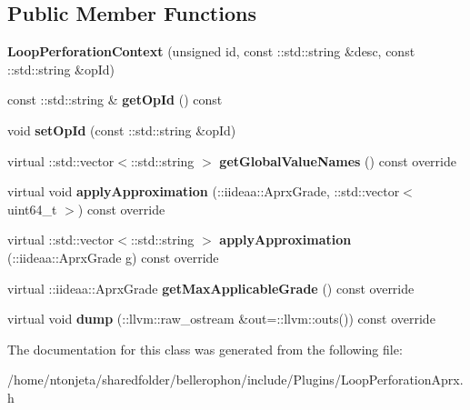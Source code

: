 \subsection*{Public Member Functions}
\begin{DoxyCompactItemize}
\item 
\hypertarget{classLoopPerforationContext_a45eb54006f208abc979cfd6d7c776f8b}{}\label{classLoopPerforationContext_a45eb54006f208abc979cfd6d7c776f8b} 
{\bfseries Loop\+Perforation\+Context} (unsigned id, const \+::std\+::string \&desc, const \+::std\+::string \&op\+Id)
\item 
\hypertarget{classLoopPerforationContext_aeb059a73cd5bacdd4041aad1732d72d6}{}\label{classLoopPerforationContext_aeb059a73cd5bacdd4041aad1732d72d6} 
const \+::std\+::string \& {\bfseries get\+Op\+Id} () const
\item 
\hypertarget{classLoopPerforationContext_afea00e355a9afbdcfbc9c9d63ebe1020}{}\label{classLoopPerforationContext_afea00e355a9afbdcfbc9c9d63ebe1020} 
void {\bfseries set\+Op\+Id} (const \+::std\+::string \&op\+Id)
\item 
\hypertarget{classLoopPerforationContext_ad90eeb628f0ddaeafceb7b85c51ce6cb}{}\label{classLoopPerforationContext_ad90eeb628f0ddaeafceb7b85c51ce6cb} 
virtual \+::std\+::vector$<$\+::std\+::string $>$ {\bfseries get\+Global\+Value\+Names} () const override
\item 
\hypertarget{classLoopPerforationContext_a54079a60dd33dd2a66d3f3176898cd39}{}\label{classLoopPerforationContext_a54079a60dd33dd2a66d3f3176898cd39} 
virtual void {\bfseries apply\+Approximation} (\+::iideaa\+::\+Aprx\+Grade, \+::std\+::vector$<$ uint64\+\_\+t $>$) const override
\item 
\hypertarget{classLoopPerforationContext_a4911da63983deebe1a67bd987d1aae66}{}\label{classLoopPerforationContext_a4911da63983deebe1a67bd987d1aae66} 
virtual \+::std\+::vector$<$\+::std\+::string $>$ {\bfseries apply\+Approximation} (\+::iideaa\+::\+Aprx\+Grade g) const override
\item 
\hypertarget{classLoopPerforationContext_a3925e62655b165b134125d0694199742}{}\label{classLoopPerforationContext_a3925e62655b165b134125d0694199742} 
virtual \+::iideaa\+::\+Aprx\+Grade {\bfseries get\+Max\+Applicable\+Grade} () const override
\item 
\hypertarget{classLoopPerforationContext_a97ac37b858e457a35adbea91fd3e9883}{}\label{classLoopPerforationContext_a97ac37b858e457a35adbea91fd3e9883} 
virtual void {\bfseries dump} (\+::llvm\+::raw\+\_\+ostream \&out=\+::llvm\+::outs()) const override
\end{DoxyCompactItemize}


The documentation for this class was generated from the following file\+:\begin{DoxyCompactItemize}
\item 
/home/ntonjeta/sharedfolder/bellerophon/include/\+Plugins/Loop\+Perforation\+Aprx.\+h\end{DoxyCompactItemize}
